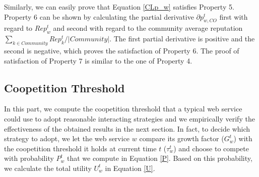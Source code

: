 \documentclass[fleqn]{singlecol-new}
\begin{document}
Similarly, we can easily prove that Equation \ref{CLp_w} satisfies
Property 5. Property 6 can be shown by calculating the partial
derivative $\partial p_{w,CO}^t$ first with regard to $Rep^t_w$
and second with regard to the community average reputation
$\sum_{k\in Community}Rep^t_k/|Community|$. The first partial
derivative is positive and the second is negative, which proves
the satisfaction of Property 6. The proof of satisfaction of
Property 7 is similar to the one of Property 4.



%
%

\subsection{Coopetition Threshold}

In this part, we compute the coopetition threshold that a typical
web service could use to adopt reasonable interacting strategies
and we empirically verify the effectiveness of the obtained
results in the next section. In fact, to decide which strategy to
adopt, we let the web service $w$ compare its growth factor
($G_w^t$) with the coopetition threshold it holds at current time
$t$ ($\tau_w^t$) and choose to compete with probability $P_w^t$
that we compute in Equation \ref{P}. Based on this probability, we
calculate the total utility $U_w^t$ in Equation \ref{U}.
\end{document}
